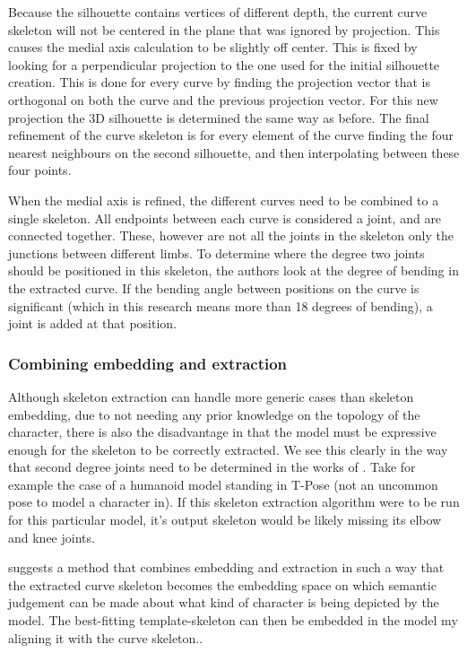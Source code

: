 \documentclass{article}
\begin{document}
Because the silhouette contains vertices of different depth, the current curve
skeleton will not be centered in the plane that was ignored by projection. This
causes the medial axis calculation to be slightly off center. This is fixed
by looking for a perpendicular projection to the one used for the initial
silhouette creation. This is done for every curve by finding the projection
vector that is orthogonal on both the curve and the previous projection vector.
For this new projection the 3D silhouette is determined the same way as before.
The final refinement of the curve skeleton is for every element of the curve
finding the four nearest neighbours on the second silhouette, and then
interpolating between these four points.

When the medial axis is refined, the different curves need to be combined to a
single skeleton. All endpoints between each curve is considered a joint, and are
connected together. These, however are not all the joints in the skeleton only
the junctions between different limbs. To determine where the degree two
joints should be positioned in this skeleton, the authors look at the degree of
bending in the extracted curve. If the bending angle between positions on the curve is 
significant (which in this research means more than 18 degrees of bending), a
joint is added at that position.

\subsubsection{Combining embedding and extraction} Although skeleton extraction
can handle more generic cases than skeleton embedding, due to not needing any
prior knowledge on the topology of the character, there is also the
disadvantage in that the model must be expressive enough for the skeleton to be
correctly  extracted. We see this clearly in the way that
second degree joints need to be determined in the works of \citep{paper2}. Take
for example the case of a humanoid model standing in T-Pose (not an uncommon
pose to model a character in). If this skeleton extraction algorithm were to be run for
this particular model, it's output skeleton would be likely missing its elbow and knee
joints. 

\citep{paper3} suggests a method that combines embedding and extraction in such
a way that the extracted curve skeleton becomes the embedding space on which semantic
judgement can be made about what kind of character is being depicted by the
model.
The best-fitting template-skeleton can then be embedded in the model my aligning it with the curve skeleton..
\end{document}
